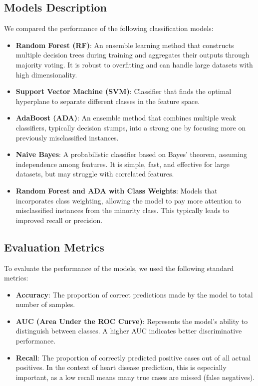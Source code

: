 \documentclass[conference]{IEEEtran}
\begin{document}
\subsection{Models Description}
We compared the performance of the following classification models:
\begin{itemize}
    \item \textbf{Random Forest (RF)}: An ensemble learning method that constructs multiple decision trees during training and aggregates their outputs through majority voting. It is robust to overfitting and can handle large datasets with high dimensionality.
    \item \textbf{Support Vector Machine (SVM)}: Classifier that finds the optimal hyperplane to separate different classes in the feature space.
    \item \textbf{AdaBoost (ADA)}: An ensemble method that combines multiple weak classifiers, typically decision stumps, into a strong one by focusing more on previously misclassified instances.
    \item \textbf{Naive Bayes}: A probabilistic classifier based on Bayes' theorem, assuming independence among features. It is simple, fast, and effective for large datasets, but may struggle with correlated features.
    \item \textbf{Random Forest and ADA with Class Weights}: Models that incorporates class weighting, allowing the model to pay more attention to misclassified instances from the minority class. This typically leads to improved recall or precision.
\end{itemize}
\subsection{Evaluation Metrics}
To evaluate the performance of the models, we used the following standard metrics:
\begin{itemize}
    \item \textbf{Accuracy}: The proportion of correct predictions made by the model to total number of samples.
    \item \textbf{AUC (Area Under the ROC Curve)}:  Represents the model’s ability to distinguish between classes. A higher AUC indicates better discriminative performance.
    \item \textbf{Recall}: The proportion of correctly predicted positive cases out of all actual positives. 
    In the context of heart disease prediction, this is especially important, 
    as a low recall means many true cases are missed (false negatives).
\end{itemize}
\end{document}
